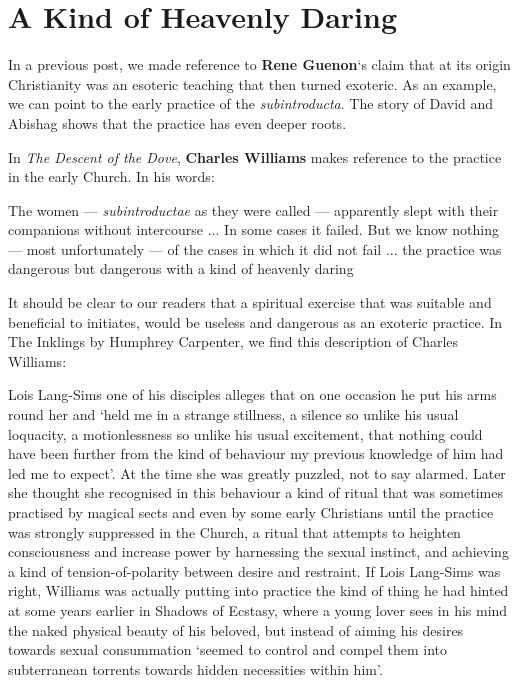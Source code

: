 \section{A Kind of Heavenly Daring}

In a previous post, we made reference to \textbf{Rene Guenon}`s claim that at its origin Christianity was an esoteric teaching that then turned exoteric. As an example, we can point to the early practice of the \emph{subintroducta}. The story of David and Abishag shows that the practice has even deeper roots.

In \emph{The Descent of the Dove}, \textbf{Charles Williams} makes reference to the practice in the early Church. In his words:

\begin{quotex}
The women --- \emph{subintroductae} as they were called --- apparently slept with their companions without intercourse ... In some cases it failed. But we know nothing --- most unfortunately --- of the cases in which it did not fail ... the practice was dangerous but dangerous with a kind of heavenly daring
\end{quotex}

It should be clear to our readers that a spiritual exercise that was suitable and beneficial to initiates, would be useless and dangerous as an exoteric practice. In The Inklings by Humphrey Carpenter, we find this description of Charles Williams:

\begin{quotex}
Lois Lang-Sims one of his disciples alleges that on one occasion he put his arms round her and `held me in a strange stillness, a silence so unlike his usual loquacity, a motionlessness so unlike his usual excitement, that nothing could have been further from the kind of behaviour my previous knowledge of him had led me to expect'. At the time she was greatly puzzled, not to say alarmed. Later she thought she recognised in this behaviour a kind of ritual that was sometimes practised by magical sects and even by some early Christians until the practice was strongly suppressed in the Church, a ritual that attempts to heighten consciousness and increase power by harnessing the sexual instinct, and achieving a kind of tension-of-polarity between desire and restraint. If Lois Lang-Sims was right, Williams was actually putting into practice the kind of thing he had hinted at some years earlier in Shadows of Ecstasy, where a young lover sees in his mind the naked physical beauty of his beloved, but instead of aiming his desires towards sexual consummation `seemed to control and compel them into subterranean torrents towards hidden necessities within him'.
\end{quotex}

